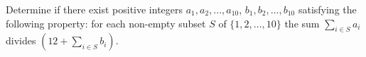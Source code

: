 Determine if there exist positive integers $a_1,a_2,...,a_{10}$, $b_1,b_2,...,b_{10}$ satisfying the following property: for each non-empty subset $S$ of $\{1,2,\ldots,10\}$  the sum  $\sum\limits_{i\in S}a_i$  divides $\left( 12+\sum\limits_{i\in S}b_i \right)$.